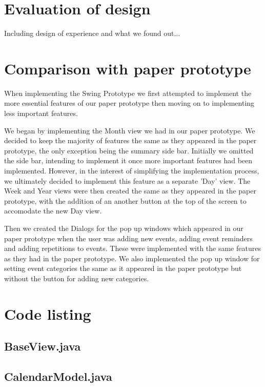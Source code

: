 \documentclass{article}
\begin{document}
\section{Evaluation of design}

Including design of experience and what we found out...

\section{Comparison with paper prototype}

When implementing the Swing Prototype we first attempted to implement
the more essential features of our paper prototype then moving on to
implementing less important features.

We began by implementing the Month view we had in our paper prototype.
We decided to keep the majority of features the same as they appeared
in the paper prototype, the only exception being the summary side bar.
Initially we omitted the side bar, intending to implement it once more
important features had been implemented. However, in the interest of
simplifying the implementation process, we ultimately decided to
implement this feature as a separate 'Day' view. The Week and Year
views were then created the same as they appeared in the paper
prototype, with the addition of an another button at the top of the
screen to accomodate the new Day view.

Then we created the Dialogs for the pop up windows which appeared in our
paper prototype when the user was adding new events, adding event
reminders and adding repetitions to events. These were implemented with
the same features as they had in the paper prototype. We also
implemented the pop up window for setting event categories the same as
it appeared in the paper prototype but without the button for adding new
categories.

\appendix

\section{Code listing}

\subsection{BaseView.java}



\subsection{CalendarModel.java}
\end{document}
